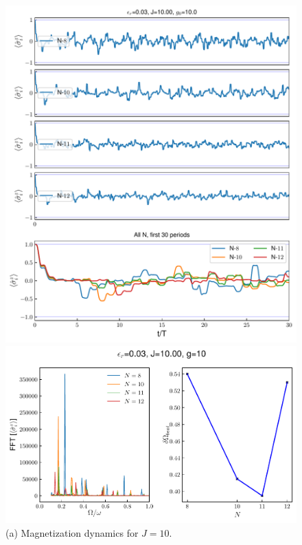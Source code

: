 \documentclass[a4paper, 11pt]{article}
\begin{document}
\begin{figure}[h!]
    \centering
    \begin{minipage}[t]{0.48\textwidth}     
        \centering
        \includegraphics[width=\textwidth]{figs/time_mag_epsilon_r0.03_J10.00_g10.0_allN.pdf}
        \caption*{(a) Magnetization dynamics for $J = 10$.}
    \end{minipage}
    \hfill
    \begin{minipage}[t]{0.48\textwidth}
        \centering
        \includegraphics[width=\textwidth]{figs/DTC_mag_fft_beat_er=0.03_J=10.0_g=10.0.pdf}

\end{minipage}
\end{figure}
\end{document}
